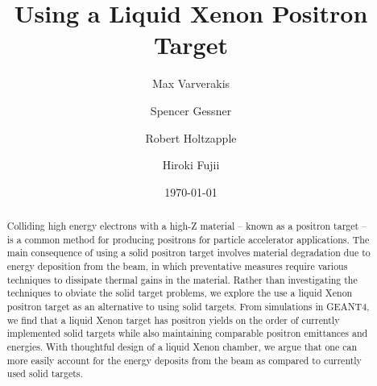 \documentclass[%
reprint,
amsmath, amssymb,
aps,
floatfix,
]{revtex4-2}
\begin{document}

\title{Using a Liquid Xenon Positron Target}%

\author{Max Varverakis}
\author{Spencer Gessner}%
%

\author{Robert Holtzapple}

\author{Hiroki Fujii}




\date{\today}

\begin{abstract}
Colliding high energy electrons with a high-Z material -- known as a positron target -- 
is a common method for producing positrons for particle accelerator applications.  The 
main consequence of using a solid positron target involves material degradation due
to energy deposition from the beam, in which preventative measures require 
various techniques to dissipate 
thermal gains in the material.  Rather than investigating the techniques to obviate
the solid target problems, we explore the use a liquid Xenon positron target as an
alternative to using solid targets.  From simulations in GEANT4, we find that a 
liquid Xenon target has positron yields on the order of currently implemented 
solid targets while also maintaining comparable positron emittances and energies.  
With thoughtful design of a liquid Xenon chamber, we argue that one can more easily
account for the energy deposits from the beam as compared to currently used solid targets.
\end{abstract}
\end{document}
